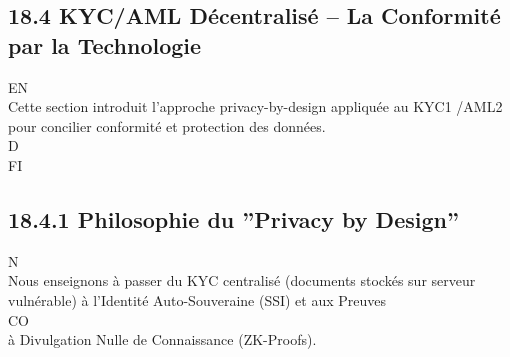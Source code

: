 \subsection{18.4 KYC/AML Décentralisé – La Conformité par la Technologie}
\vspace{0.5em}
\vspace{0.5em}
\vspace{0.5em}
\vspace{0.5em}
EN\\
Cette section introduit l’approche privacy-by-design appliquée au KYC1 /AML2 pour concilier conformité et protection des données.\\
\vspace{0.5em}
\vspace{0.5em}
\vspace{0.5em}
\vspace{0.5em}
D\\
FI\\
\subsection{18.4.1 Philosophie du ”Privacy by Design”}
\vspace{0.5em}
N\\
Nous enseignons à passer du KYC centralisé (documents stockés sur serveur vulnérable) à l’Identité Auto-Souveraine (SSI) et aux Preuves\\
CO\\
à Divulgation Nulle de Connaissance (ZK-Proofs).\\
\vspace{0.5em}
\vspace{0.5em}
